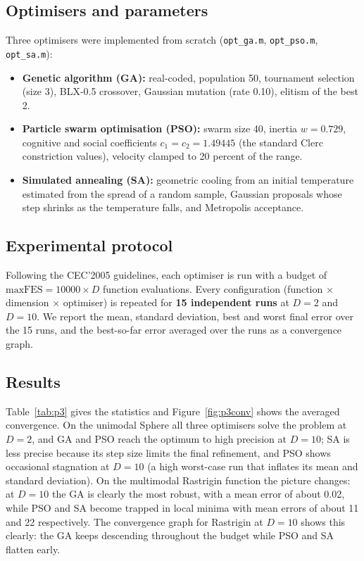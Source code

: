 \documentclass[11pt,a4paper]{article}
\begin{document}
\subsection{Optimisers and parameters}
Three optimisers were implemented from scratch (\texttt{opt\_ga.m}, \texttt{opt\_pso.m},
\texttt{opt\_sa.m}):
\begin{itemize}
  \item \textbf{Genetic algorithm (GA):} real-coded, population 50, tournament selection (size 3),
        BLX-0.5 crossover, Gaussian mutation (rate 0.10), elitism of the best 2.
  \item \textbf{Particle swarm optimisation (PSO):} swarm size 40, inertia $w = 0.729$, cognitive and
        social coefficients $c_1 = c_2 = 1.49445$ (the standard Clerc constriction values), velocity
        clamped to 20 percent of the range.
  \item \textbf{Simulated annealing (SA):} geometric cooling from an initial temperature estimated from
        the spread of a random sample, Gaussian proposals whose step shrinks as the temperature falls, and
        Metropolis acceptance.
\end{itemize}

\subsection{Experimental protocol}
Following the CEC'2005 guidelines, each optimiser is run with a budget of $\text{maxFES} = 10000 \times D$
function evaluations. Every configuration (function $\times$ dimension $\times$ optimiser) is repeated for
\textbf{15 independent runs} at $D = 2$ and $D = 10$. We report the mean, standard deviation, best and
worst final error over the 15 runs, and the best-so-far error averaged over the runs as a convergence
graph.

\subsection{Results}
Table~\ref{tab:p3} gives the statistics and Figure~\ref{fig:p3conv} shows the averaged convergence. On the
unimodal Sphere all three optimisers solve the problem at $D=2$, and GA and PSO reach the optimum to high
precision at $D=10$; SA is less precise because its step size limits the final refinement, and PSO shows
occasional stagnation at $D=10$ (a high worst-case run that inflates its mean and standard deviation). On
the multimodal Rastrigin function the picture changes: at $D=10$ the GA is clearly the most robust, with a
mean error of about 0.02, while PSO and SA become trapped in local minima with mean errors of about 11 and
22 respectively. The convergence graph for Rastrigin at $D=10$ shows this clearly: the GA keeps descending
throughout the budget while PSO and SA flatten early.
\end{document}
